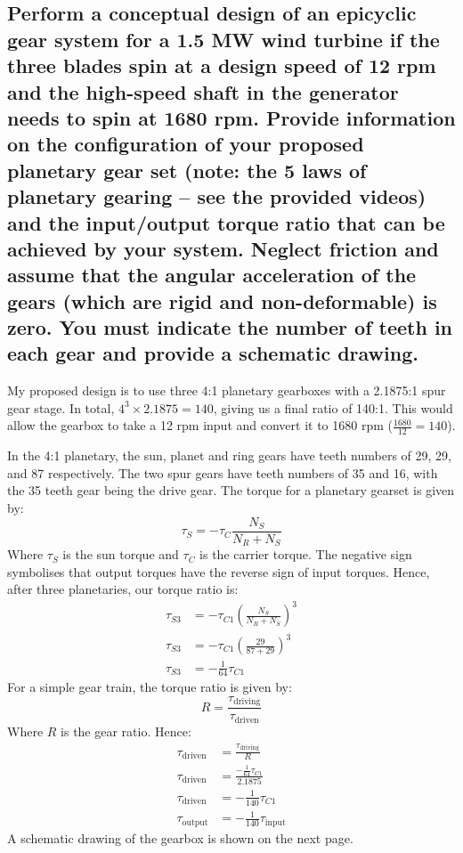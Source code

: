 \documentclass[12pt]{article}
\numberwithin{equation}{section}
\begin{document}
\begin{flushleft}
\subsection[Schematic.]{Perform a conceptual design of an epicyclic gear system for a 1.5 MW wind turbine if the three blades spin at a design speed of 12 rpm and the high-speed shaft in the generator needs to spin at 1680 rpm. Provide information on the configuration of your proposed planetary gear set (note: the 5 laws of planetary gearing – see the provided videos) and the input/output torque ratio that can be achieved by your system. Neglect friction and assume that the angular acceleration of the gears (which are rigid and non-deformable) is zero. You must indicate the number of teeth in each gear and provide a schematic drawing.}
My proposed design is to use three 4:1 planetary gearboxes with a 2.1875:1 spur gear stage. In total, $4^3 \times 2.1875 = 140$, giving us a final ratio of 140:1. This would allow the gearbox to take a 12 rpm input and convert it to 1680 rpm ($\frac{1680}{12} = 140$).

In the 4:1 planetary, the sun, planet and ring gears have teeth numbers of 29, 29, and 87 respectively. The two spur gears have teeth numbers of 35 and 16, with the 35 teeth gear being the drive gear. The torque for a planetary gearset is given by:
\begin{equation}
  \tau_S = - \tau_C \frac{N_S}{N_R + N_S}
\end{equation}
Where $\tau_S$ is the sun torque and $\tau_C$ is the carrier torque. The negative sign symbolises that output torques have the reverse sign of input torques.
Hence, after three planetaries, our torque ratio is:
\begin{align}
  \tau_{S3} &= - \tau_{C1} \left( \frac{N_S}{N_R + N_S} \right)^3\\
  \tau_{S3} &= - \tau_{C1} \left( \frac{29}{87 + 29} \right)^3\\
  \tau_{S3} &= - \frac{1}{64}\tau_{C1} 
\end{align}
For a simple gear train, the torque ratio is given by:
\begin{equation}
  R = \frac{\tau_{\textrm{driving}}}{\tau_{\textrm{driven}}}
\end{equation}
Where $R$ is the gear ratio. Hence:
\begin{align}
  \tau_{\textrm{driven}} &= \frac{\tau_{\textrm{driving}}}{R}\\
  \tau_{\textrm{driven}} &= \frac{- \frac{1}{64}\tau_{C1} }{2.1875}\\
  \tau_{\textrm{driven}} &= -\frac{1}{140} \tau_{C1}\\
  \tau_{\textrm{output}} &= -\frac{1}{140} \tau_{\textrm{input}}
\end{align}
A schematic drawing of the gearbox is shown on the next page.
\newpage
\setcounter{page}{11}

\end{flushleft}
\end{document}
